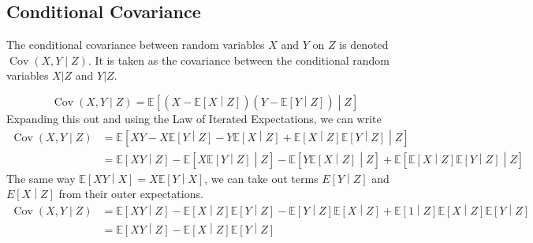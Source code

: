 \documentclass[11pt]{report} %
\begin{document}
\subsection{Conditional Covariance}

The conditional covariance between random variables $X$ and $Y$ on $Z$ is denoted $\operatorname{Cov}\left(X, Y\middle| Z\right)$. It is taken as the covariance between the conditional random variables $X|Z$ and $Y|Z$.

\begin{equation}
\operatorname{Cov}\left(X, Y\middle| Z\right) = \mathbb{E}\left[\left(X - \mathbb{E}\left[X\middle| Z\right]\right)\left(Y - \mathbb{E}\left[Y\middle| Z\right]\right)\middle|Z\right]
\end{equation}
Expanding this out and using the Law of Iterated Expectations, we can write
\begin{align}
\operatorname{Cov}\left(X, Y\middle| Z\right) &= \mathbb{E}\left[XY - X\mathbb{E}\left[Y\middle|Z\right] - Y\mathbb{E}\left[X\middle|Z\right] + \mathbb{E}\left[X\middle| Z\right]\mathbb{E}\left[Y\middle| Z\right]\middle|Z\right] \\
&= \mathbb{E}\left[XY\middle|Z\right] - \mathbb{E}\left[X\mathbb{E}\left[Y\middle|Z\right]\middle|Z\right] - \mathbb{E}\left[Y\mathbb{E}\left[X\middle|Z\right]\middle|Z\right] +\mathbb{E}\left[\mathbb{E}\left[X\middle| Z\right]\mathbb{E}\left[Y\middle| Z\right]\middle|Z\right]
\end{align}
The same way $\mathbb{E}\left[XY\middle|X\right] = X\mathbb{E}\left[Y\middle|X\right]$, we can take out terms ${E}\left[Y\middle|Z\right]$ and ${E}\left[X\middle|Z\right]$ from their outer expectations.
\begin{align}
\operatorname{Cov}\left(X, Y\middle| Z\right) &= \mathbb{E}\left[XY\middle|Z\right] - \mathbb{E}\left[X\middle|Z\right]\mathbb{E}\left[Y\middle|Z\right] - \mathbb{E}\left[Y\middle|Z\right]\mathbb{E}\left[X\middle|Z\right] +\mathbb{E}\left[1\middle|Z\right]\mathbb{E}\left[X\middle| Z\right]\mathbb{E}\left[Y\middle| Z\right] \\
 &= \mathbb{E}\left[XY\middle|Z\right] - \mathbb{E}\left[X\middle|Z\right]\mathbb{E}\left[Y\middle|Z\right]
\end{align}
\end{document}
